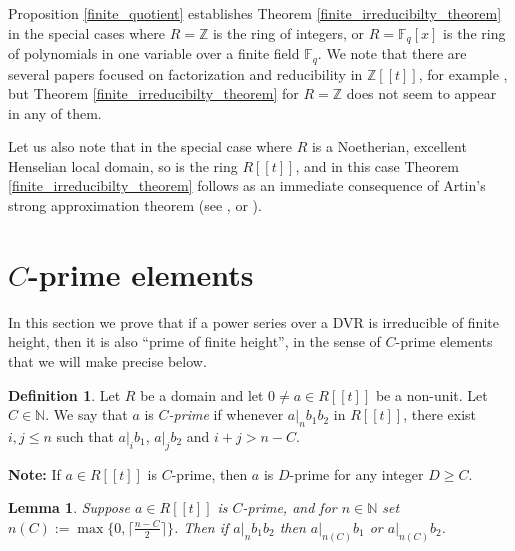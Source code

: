 \documentclass{article}
\newcommand{\F}{\mathbb{F}}
\newcommand{\Z}{\mathbb{Z}}
\theoremstyle{plain}
\newtheorem{lemma}[theorem]{Lemma}
\theoremstyle{definition}
\newtheorem{definition}[theorem]{Definition}
\theoremstyle{remark}
\theoremstyle{plain}
\begin{document}
Proposition \ref{finite_quotient} establishes Theorem \ref{finite_irreducibilty_theorem} in the special cases where $R = \Z$ is the ring of integers, or $R = \F_q[x]$ is the ring of polynomials in one variable over a finite field $\F_q$. We note that there are several papers focused on factorization and reducibility in $\mathbb Z[[t]]$, for example \cite{BGW07,BG08,BGW12,BGW14,BGW14b,Elliott14,DS21}, but Theorem \ref{finite_irreducibilty_theorem} for $R = \Z$ does not seem to appear in any of them.

Let us also note that in the special case where $R$ is a Noetherian, excellent Henselian local domain, so is the ring $R[[t]]$, and in this case Theorem \ref{finite_irreducibilty_theorem} follows as an immediate consequence of Artin's strong approximation theorem (see \cite[Theorem 3.7]{ScheidererWeightedSOS}, or \cite[\S1, Definition 1.1, and the main theorem on pp.~145--146]{PfisterPopescu1975}).



\section{$C$-prime elements}\label{sec:quasi_primality}

In this section we prove that if a power series over a DVR is irreducible of finite height, then it is also ``prime of finite height'', in the sense of $C$-prime elements that we will make precise below.

\begin{definition} 
Let $R$ be a domain and let $0\neq a\in R[[t]]$ be a non-unit. Let $C\in\mathbb{N}$. We say that $a$ is \emph{$C$-prime} if whenever $a|_n b_1b_2$ in $R[[t]]$, there exist $i,j\leq n$ such that $a|_ib_1$, $a|_jb_2$ and $i+j> n-C$.

\end{definition}

\noindent\textbf{Note:} If $a\in R[[t]]$ is $C$-prime, then $a$ is $D$-prime for any integer $D\geq C$.

\begin{lemma}\label{prime bound}
Suppose $a\in R[[t]]$ is $C$-prime, and for $n\in\mathbb{N}$ set $n(C):=\max\{0,\lceil\frac{n-C}{2}\rceil\}$. Then if $a|_nb_1b_2$ then $a|_{n(C)}b_1$ or $a|_{n(C)}b_2$.
\end{lemma}
\end{document}
